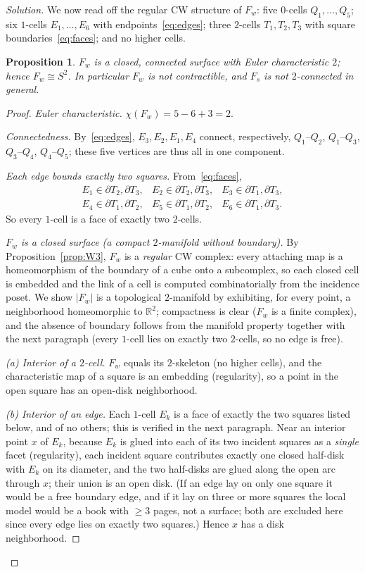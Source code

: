 \documentclass{amsart}
\newtheorem{proposition}{Proposition}
\theoremstyle{definition}
\newcommand{\RR}{\mathbb{R}}
\newcommand{\bdy}{\partial}
\begin{document}
\begin{proof}[Solution]
We now read off the regular CW structure of $F_w$: five $0$-cells $Q_1,\dots,Q_5$; six
$1$-cells $E_1,\dots,E_6$ with endpoints~\eqref{eq:edges}; three $2$-cells $T_1,T_2,T_3$ with
square boundaries~\eqref{eq:faces}; and no higher cells.

\begin{proposition}\label{prop:s2}
$F_w$ is a closed, connected surface with Euler characteristic $2$; hence $F_w\cong S^2$. In
particular $F_w$ is not contractible, and $F_s$ is not $2$-connected in general.
\end{proposition}

\begin{proof}
\emph{Euler characteristic.} $\chi(F_w)=5-6+3=2$.

\emph{Connectedness.} By~\eqref{eq:edges}, $E_3,E_2,E_1,E_4$ connect, respectively, $Q_1$--$Q_2$,
$Q_1$--$Q_3$, $Q_3$--$Q_4$, $Q_4$--$Q_5$; these five vertices are thus all in one component.

\emph{Each edge bounds exactly two squares.} From~\eqref{eq:faces},
\[
\begin{array}{lll}
E_1\in\bdy T_2,\bdy T_3, & E_2\in\bdy T_2,\bdy T_3, & E_3\in\bdy T_1,\bdy T_3,\\
E_4\in\bdy T_1,\bdy T_2, & E_5\in\bdy T_1,\bdy T_2, & E_6\in\bdy T_1,\bdy T_3.
\end{array}
\]
So every $1$-cell is a face of exactly two $2$-cells.

\emph{$F_w$ is a closed surface (a compact $2$-manifold without boundary).} By
Proposition~\ref{prop:W3}, $F_w$ is a \emph{regular} CW complex: every attaching map is a
homeomorphism of the boundary of a cube onto a subcomplex, so each closed cell is embedded and
the link of a cell is computed combinatorially from the incidence poset. We show $|F_w|$ is a
topological $2$-manifold by exhibiting, for every point, a neighborhood homeomorphic to
$\RR^2$; compactness is clear ($F_w$ is a finite complex), and the absence of boundary follows
from the manifold property together with the next paragraph (every $1$-cell lies on exactly two
$2$-cells, so no edge is free).

\emph{(a) Interior of a $2$-cell.} $F_w$ equals its $2$-skeleton (no higher cells), and the
characteristic map of a square is an embedding (regularity), so a point in the open square has
an open-disk neighborhood.

\emph{(b) Interior of an edge.} Each $1$-cell $E_k$ is a face of exactly the two squares listed
below, and of no others; this is verified in the next paragraph. Near an interior point $x$ of
$E_k$, because $E_k$ is glued into each of its two incident squares as a \emph{single} facet
(regularity), each incident square contributes exactly one closed half-disk with $E_k$ on its
diameter, and the two half-disks are glued along the open arc through $x$; their union is an
open disk. (If an edge lay on only one square it would be a free boundary edge, and if it lay on
three or more squares the local model would be a book with $\ge 3$ pages, not a surface; both
are excluded here since every edge lies on exactly two squares.) Hence $x$ has a disk
neighborhood.


\end{proof}
\end{proof}
\end{document}
